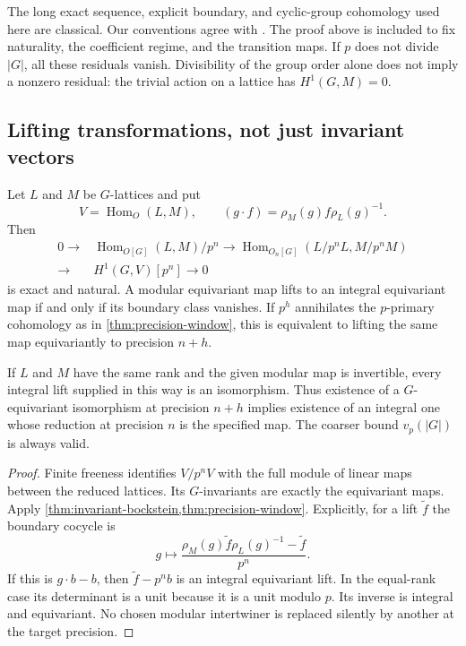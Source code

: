 The long exact sequence, explicit boundary, and cyclic-group cohomology used here are classical. Our conventions agree with \cite[Chapter II, 1.9, 1.18--1.21]{MilneCFT2020}. The proof above is included to fix naturality, the coefficient regime, and the transition maps. If $p$ does not divide $|G|$, all these residuals vanish. Divisibility of the group order alone does not imply a nonzero residual: the trivial action on a lattice has $H^1(G,M)=0$.

\subsection{Lifting transformations, not just invariant vectors}

\begin{theorem}\label{thm:intertwiner-lifting}
Let $L$ and $M$ be $G$-lattices and put
\[
 V=\operatorname{Hom}_O(L,M),\qquad
 (g\cdot f)=\rho_M(g)f\rho_L(g)^{-1}.
\]
Then
\[
 \begin{split}
 0\longrightarrow&\operatorname{Hom}_{O[G]}(L,M)/p^n
 \longrightarrow\operatorname{Hom}_{O_n[G]}(L/p^nL,M/p^nM)\\
 \longrightarrow&H^1(G,V)[p^n]\longrightarrow0
 \end{split}
\]
is exact and natural. A modular equivariant map lifts to an integral equivariant map if and only if its boundary class vanishes. If $p^h$ annihilates the $p$-primary cohomology as in \cref{thm:precision-window}, this is equivalent to lifting the same map equivariantly to precision $n+h$.

If $L$ and $M$ have the same rank and the given modular map is invertible, every integral lift supplied in this way is an isomorphism. Thus existence of a $G$-equivariant isomorphism at precision $n+h$ implies existence of an integral one whose reduction at precision $n$ is the specified map. The coarser bound $v_p(|G|)$ is always valid.
\end{theorem}
\begin{proof}
Finite freeness identifies $V/p^nV$ with the full module of linear maps between the reduced lattices. Its $G$-invariants are exactly the equivariant maps. Apply \cref{thm:invariant-bockstein,thm:precision-window}. Explicitly, for a lift $\widetilde f$ the boundary cocycle is
\[
 g\longmapsto\frac{\rho_M(g)\widetilde f\rho_L(g)^{-1}-\widetilde f}{p^n}.
\]
If this is $g\cdot b-b$, then $\widetilde f-p^n b$ is an integral equivariant lift. In the equal-rank case its determinant is a unit because it is a unit modulo $p$. Its inverse is integral and equivariant. No chosen modular intertwiner is replaced silently by another at the target precision.
\end{proof}

